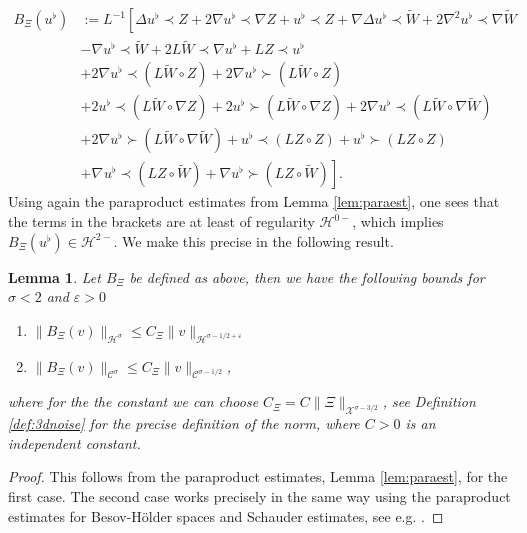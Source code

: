 \documentclass[11pt, oneside]{article}   	%
\newcommand{\assign}{:=}
\newenvironment{enumeratenumeric}{\begin{enumerate}[1.] }{\end{enumerate}}
\newtheorem{lemma}[theorem]{Lemma}
\newcommand{\CC}{\mathscr{C}}
\newcommand{\ssp}{\mathscr{H}}
\begin{document}
\begin{equation}\label{eqn:3db}
\begin{aligned}
B_{\Xi} (u^{\flat}) & \assign L^{- 1} \left[ \Delta u^{\flat} \prec Z + 2\nabla
u^{\flat} \prec \nabla Z + u^{\flat} \prec Z + \nabla \Delta u^{\flat} \prec
\widetilde{W} + 2\nabla^2 u^{\flat} \prec \nabla \widetilde{W}\right.\\
 &- \nabla u^{\flat}
\prec \widetilde{W} + 2 L \widetilde{W} \prec \nabla u^{\flat} + L Z \prec u^{\flat}
\\ & + 2 \nabla u^{\flat} \prec (L \widetilde{W} \circ Z) + 2 \nabla u^{\flat} \succ
(L \widetilde{W} \circ Z) \\
 &+ 2 u^{\flat} \prec (L \widetilde{W} \circ \nabla Z) + 2
u^{\flat} \succ (L \widetilde{W} \circ \nabla Z) +  2 \nabla u^{\flat} \prec (L
\widetilde{W} \circ \nabla \widetilde{W}) \\
&+ 2 \nabla u^{\flat} \succ (L \widetilde{W}
\circ \nabla \widetilde{W}) + u^{\flat} \prec (L Z \circ Z)+u^{\flat} \succ (L
Z \circ Z)\\ 
&+ \left. \nabla^{} u^{\flat} \prec (L Z \circ \widetilde{W}) + \nabla
u^{\flat} \succ (L Z \circ \widetilde{W}) \right] . 
\end{aligned}
\end{equation}
Using again the paraproduct estimates from Lemma \ref{lem:paraest}, one sees
that the terms in the brackets are at least of regularity $\ssp^{0 -}$, which
implies $B_{\Xi} (u^{\flat}) \in \ssp^{2 -}.$ We make this precise in the following result.


\begin{lemma}
	Let $B_{\Xi}$ be defined as above, then we have the following bounds for
	$\sigma < 2$ and $\varepsilon > 0$
	\begin{enumeratenumeric}
		\item $\| B_{\Xi} (v) \|_{\ssp^{\sigma}} \le C_{\Xi} \| v \|_{\ssp^{\sigma
				- 1 / 2 + \varepsilon}} $
		
		\item $\| B_{\Xi} (v) \|_{\CC^{\sigma}} \le C_{\Xi} \| v
		\|_{\CC^{\sigma - 1 / 2}} $,
	\end{enumeratenumeric}
	where for the the constant we can choose $C_{\Xi} = C \| \Xi
	\|_{{\mathscr{X}}^{\sigma - 3 / 2}}$, see Definition \ref{def:3dnoise} for the precise definition of the norm, where $C > 0$ is an independent constant. 
\end{lemma}
\begin{proof}
	This follows from the paraproduct estimates, Lemma \ref{lem:paraest}, for
	the first case. The second case works precisely in the same way using the
	paraproduct estimates for Besov-H\"older spaces and Schauder estimates, see
	e.g. {\cite{gubinelli2015paracontrolled}}.
\end{proof}
\end{document}

